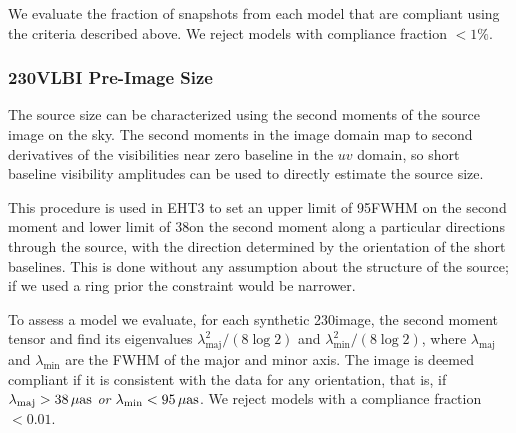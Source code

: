 We evaluate the fraction of snapshots from each model that are compliant using the criteria described above.  We reject models with compliance fraction $< 1\%$.

\subsubsection{230\GHz VLBI Pre-Image Size}


The source size can be characterized using the second moments of the source image on the sky.  The second moments in the image domain map to second derivatives of the visibilities near zero baseline in the $uv$ domain, so short baseline visibility amplitudes can be used to directly estimate the source size.



This procedure is used in EHT3  to set an upper limit of 95\uas FWHM on the second moment and lower limit of 38\uas on the second moment along a particular directions through the source, with the direction determined by the orientation of the short baselines.  This is done without any assumption about the structure of the source; if we used a ring prior the constraint would be narrower.

To assess a model we evaluate, for each synthetic 230\GHz image, the second moment tensor and find its eigenvalues $\lambda_\mathrm{maj}^2/(8\log 2)$ and $\lambda_\mathrm{min}^2/(8\log 2)$, where $\lambda_\mathrm{maj}$ and $\lambda_\mathrm{min}$ are the FWHM of the major and minor axis.  The image is deemed compliant if it is consistent with the data for any orientation, that is, if $\lambda_\mathrm{maj} > 38\,\mathrm{\mu as}$ \emph{or} $\lambda_\mathrm{min} < 95\,\mathrm{\mu as}$.  We reject models with a compliance fraction $< 0.01$.

